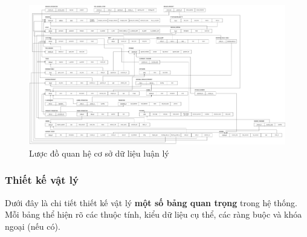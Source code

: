 \begin{landscape}

	\begin{figure}[H]
		\centering
		\includegraphics[height=0.9\textheight]{Images/relation.png}
		\vspace{0.5cm}
		\caption{Lược đồ quan hệ cơ sở dữ liệu luận lý}
		\label{fig:my_label}
	\end{figure}

\end{landscape}


\subsubsection{Thiết kế vật lý}

Dưới đây là chi tiết thiết kế vật lý \textbf{một số bảng quan trọng} trong hệ thống. Mỗi bảng thể hiện rõ các thuộc tính, kiểu dữ liệu cụ thể, các ràng buộc và khóa ngoại (nếu có).

